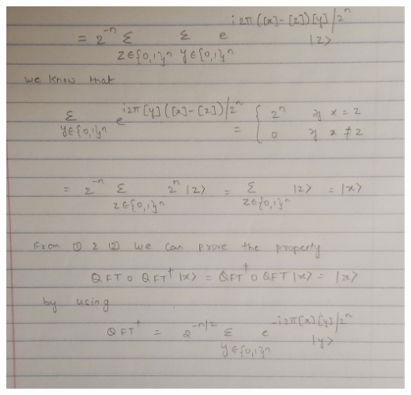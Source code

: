 \documentclass [12pt]{article}
\theoremstyle{definition}
\begin{document}
\includegraphics[width=18cm, height=23cm]{I2}

\newpage
\end{document}
